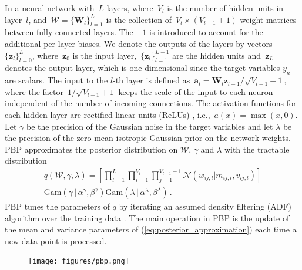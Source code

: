 \documentclass{pnastwo}
\newcommand{\given}{\,|\,}
\newcommand{\DistGam}{\text{Gam}}
\begin{document}
\begin{article}
In a neural network with~$L$ layers, where~$V_l$ is the number of hidden units in layer~$l$, and~${\mathcal{W} = \{ \mathbf{W}_l \}_{l=1}^L}$ is the collection of~${V_l\times (V_{l-1}+1)}$ weight matrices between fully-connected layers. The $+1$ is introduced to account for the additional per-layer biases. We denote the outputs of the layers by vectors~$\{ \mathbf{z}_l \}_{l=0}^{L}$, where~$\mathbf{z}_0$ is the input layer,~${\{\mathbf{z}_l\}_{l=1}^{L-1}}$ are the hidden units and~$\mathbf{z}_L$ denotes the output layer, which is one-dimensional since the target variables $y_n$ are scalars.  
The input to the $l$-th layer is defined as~${\mathbf{a}_l = \mathbf{W}_l \mathbf{z}_{l-1} / \sqrt{V_{l-1}+1} }$,
where the factor~${1/\sqrt{V_{l-1} + 1}}$ keeps the scale of the input to each neuron independent
of the number of incoming connections.
The activation functions for each hidden layer are rectified linear units (ReLUs)
\cite{nair2010rectified}, i.e.,~${a(x) = \max(x,0)}$.
Let $\gamma$ be the precision of the Gaussian noise in the target variables and let $\lambda$
be the precision of the zero-mean isotropic Gaussian prior on the network weights.
PBP approximates the posterior distribution on $\mathcal{W}$, $\gamma$ and $\lambda$ with
the tractable distribution
\begin{multline}
q(\mathcal{W},\gamma, \lambda) = \textstyle \left[ \prod_{l=1}^L\! \prod_{i=1}^{V_l}\! 
\prod_{j=1}^{V_{l\!-\!1}\!+\!1} \mathcal{N}(w_{ij,l}| m_{ij,l},v_{ij,l})\right ]
\\ \DistGam(\gamma\given \alpha^\gamma, \beta^\gamma)
\DistGam(\lambda\given \alpha^\lambda, \beta^\lambda)\,.\label{eq:posterior_approximation}
\end{multline}
PBP tunes the parameters of $q$ by iterating an assumed
density filtering (ADF) algorithm over the training data \cite{opper1998bayesian}. The main operation in PBP
is the update of the mean and variance parameters of (\ref{eq:posterior_approximation})
each time a new data point is processed. 

\begin{figure}[hb]
\centering
\texttt{[image: figures/pbp.png]}


\end{figure}
\end{article}
\end{document}
